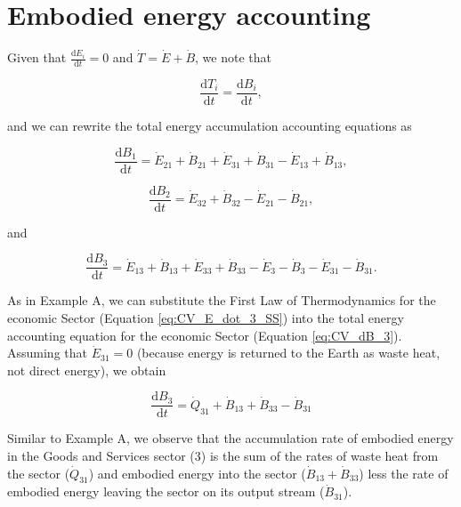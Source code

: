 \section{Embodied energy accounting}

Given that $\frac{\mathrm{d}E_{i}}{\mathrm{d}t} = 0$ and $\dot{T} = \dot{E} + \dot{B}$, we note that

\begin{equation} \label{eq:T_dot_equals_B_dot}
	\frac{\mathrm{d}T_i}{\mathrm{d}t} = \frac{\mathrm{d}B_i}{\mathrm{d}t},
\end{equation}

\noindent and we can rewrite the total energy accumulation accounting equations as

\begin{equation} \label{eq:CV_dB_1}
	\frac{\mathrm{d}B_{1}}{\mathrm{d}t} = \dot{E}_{21} + \dot{B}_{21} + \dot{E}_{31} + \dot{B}_{31} - \dot{E}_{13} + \dot{B}_{13},
\end{equation}

\begin{equation} \label{eq:CV_dB_2}
	\frac{\mathrm{d}B_{2}}{\mathrm{d}t} = \dot{E}_{32} + \dot{B}_{32} - \dot{E}_{21} - \dot{B}_{21},
\end{equation}

\noindent and 

\begin{equation} \label{eq:CV_dB_3}
	\frac{\mathrm{d}B_{3}}{\mathrm{d}t} = \dot{E}_{13} + \dot{B}_{13} + \dot{E}_{33} + \dot{B}_{33} - \dot{E}_{3} - \dot{B}_{3} - \dot{E}_{31} - \dot{B}_{31}.
\end{equation}

As in Example A, we can substitute the First Law of Thermodynamics for the economic Sector (Equation \ref{eq:CV_E_dot_3_SS}) into the total energy accounting equation for the economic Sector (Equation \ref{eq:CV_dB_3}). Assuming that $\dot{E}_{31} = 0$ (because energy is returned to the Earth as waste heat, not direct energy), we obtain

\begin{equation} \label{eq:ExB_embodied_energy_accounting}
	\frac{\mathrm{d}B_3}{\mathrm{d}t} = \dot{Q}_{31} + \dot{B}_{13} + \dot{B}_{33} - \dot{B}_{31}
\end{equation}

Similar to Example A, we observe that the accumulation rate of embodied energy in the Goods and Services sector (3) is the sum of the rates of waste heat from the sector ($\dot{Q}_{31}$) and embodied energy into the sector ($\dot{B}_{13} + \dot{B}_{33}$) less the rate of embodied energy leaving the sector on its output stream ($\dot{B}_{31}$).

